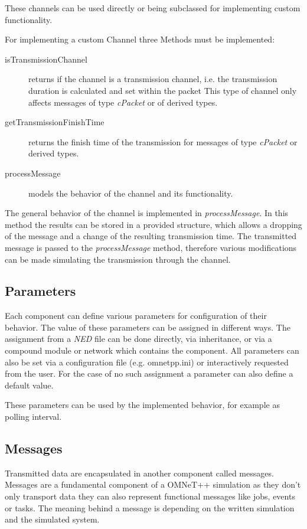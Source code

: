 These channels can be used directly or being subclassed for implementing custom functionality. \cite[section 3.5]{omnet_manual}

For implementing a custom Channel three Methods must be implemented:

\begin{description}
    \item[isTransmissionChannel] returns if the channel is a transmission channel, i.e. the transmission duration is calculated and set within the packet
    This type of channel only affects messages of type \emph{cPacket} or of derived types.
    \item[getTransmissionFinishTime] returns the finish time of the transmission for messages of type \emph{cPacket} or derived types.
    \item[processMessage] models the behavior of the channel and its functionality.
\end{description}

The general behavior of the channel is implemented in \emph{processMessage}.
In this method the results can be stored in a provided structure, which allows a dropping of the message and a change of the resulting transmission time.
The transmitted message is passed to the \emph{processMessage} method, therefore various modifications can be made simulating the transmission through the channel. \cite[section 4.8]{omnet_manual}

\subsection{Parameters}
\label{sec:omnet_components_parameters}
Each component can define various parameters for configuration of their behavior.
The value of these parameters can be assigned in different ways.
The assignment from a \emph{NED} file can be done directly, via inheritance, or via a compound module or network which contains the component.
All parameters can also be set via a configuration file (e.g. omnetpp.ini) or interactively requested from the user.
For the case of no such assignment a parameter can also define a default value.

These parameters can be used by the implemented behavior, for example as polling interval. \cite[section 3.6]{omnet_manual}


\subsection{Messages}
\label{sec:omnet_components_messages}
Transmitted data are encapsulated in another component called messages.
Messages are a fundamental component of a OMNeT++ simulation as they don't only transport data they can also represent functional messages like jobs, events or tasks.
The meaning behind a message is depending on the written simulation and the simulated system. \cite[chapter 5]{omnet_manual}

